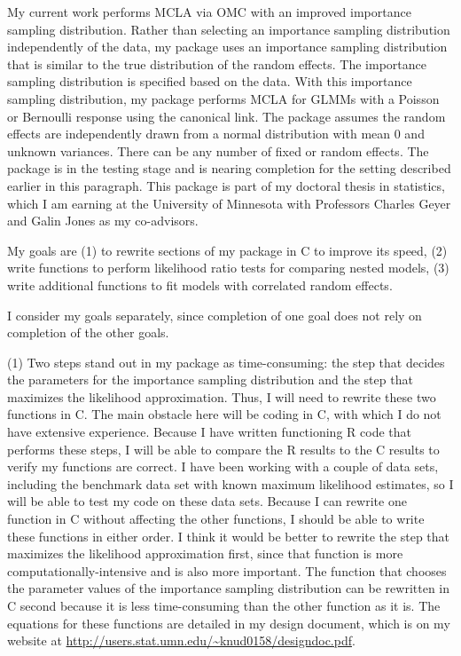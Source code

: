 \documentclass[12pt]{article}
\begin{document}
My current work performs MCLA via OMC with an improved importance sampling distribution.  Rather than selecting an importance sampling distribution independently of the data, my  package uses an importance sampling distribution that is similar to the true distribution of the random effects.  The importance sampling distribution is specified based on the data.  With this importance sampling distribution, my package performs MCLA for GLMMs with a Poisson or Bernoulli response using the canonical link.  The package assumes the random effects are independently drawn from a normal distribution with mean 0 and unknown variances. There can be any number of fixed or random effects.  The package is in the testing stage and is nearing completion for the setting described earlier in this paragraph.  This package is part of my doctoral thesis in statistics, which I am earning at the University of Minnesota with Professors Charles Geyer and Galin Jones as my co-advisors.




My goals are  (1) to rewrite sections of my package in C to  improve its speed, (2) write functions to perform likelihood ratio tests for comparing nested models, (3) write additional functions to fit models with correlated random effects.  




I consider my  goals separately, since completion of one goal does not rely on completion of the other goals.

(1) Two steps stand out in my package as time-consuming: the step that decides the parameters for the importance sampling distribution and the step that maximizes the likelihood approximation. Thus, I will need to rewrite these two functions in C.  The main obstacle here will be coding in C, with which I do not have extensive experience.  Because I have written functioning R code that performs these steps, I will be able to compare the R results to the C results to verify my functions are correct. I have been working with a couple of data sets, including the benchmark \citet{booth:hobert:1999} data set with known maximum likelihood estimates, so I will be able to test my code on these data sets. Because I can rewrite one function in C without affecting the other functions, I should be able to write these functions in either order.  I think it would be better to rewrite the step that maximizes the likelihood approximation first, since  that function is more computationally-intensive and is also more important.  The function that chooses the parameter values of the importance sampling distribution can be rewritten in C second because it is less time-consuming than the other function as it is. The equations for these functions are detailed in my design document, which is on my website at \url{http://users.stat.umn.edu/~knud0158/designdoc.pdf}.
\end{document}
